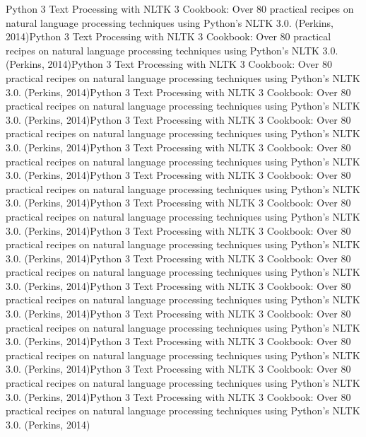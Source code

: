 Python 3 Text Processing with NLTK 3 Cookbook: Over 80 practical recipes on natural language processing techniques using Python's NLTK 3.0. (Perkins, 2014)Python 3 Text Processing with NLTK 3 Cookbook: Over 80 practical recipes on natural language processing techniques using Python's NLTK 3.0. (Perkins, 2014)Python 3 Text Processing with NLTK 3 Cookbook: Over 80 practical recipes on natural language processing techniques using Python's NLTK 3.0. (Perkins, 2014)Python 3 Text Processing with NLTK 3 Cookbook: Over 80 practical recipes on natural language processing techniques using Python's NLTK 3.0. (Perkins, 2014)Python 3 Text Processing with NLTK 3 Cookbook: Over 80 practical recipes on natural language processing techniques using Python's NLTK 3.0. (Perkins, 2014)Python 3 Text Processing with NLTK 3 Cookbook: Over 80 practical recipes on natural language processing techniques using Python's NLTK 3.0. (Perkins, 2014)Python 3 Text Processing with NLTK 3 Cookbook: Over 80 practical recipes on natural language processing techniques using Python's NLTK 3.0. (Perkins, 2014)Python 3 Text Processing with NLTK 3 Cookbook: Over 80 practical recipes on natural language processing techniques using Python's NLTK 3.0. (Perkins, 2014)Python 3 Text Processing with NLTK 3 Cookbook: Over 80 practical recipes on natural language processing techniques using Python's NLTK 3.0. (Perkins, 2014)Python 3 Text Processing with NLTK 3 Cookbook: Over 80 practical recipes on natural language processing techniques using Python's NLTK 3.0. (Perkins, 2014)Python 3 Text Processing with NLTK 3 Cookbook: Over 80 practical recipes on natural language processing techniques using Python's NLTK 3.0. (Perkins, 2014)Python 3 Text Processing with NLTK 3 Cookbook: Over 80 practical recipes on natural language processing techniques using Python's NLTK 3.0. (Perkins, 2014)Python 3 Text Processing with NLTK 3 Cookbook: Over 80 practical recipes on natural language processing techniques using Python's NLTK 3.0. (Perkins, 2014)Python 3 Text Processing with NLTK 3 Cookbook: Over 80 practical recipes on natural language processing techniques using Python's NLTK 3.0. (Perkins, 2014)Python 3 Text Processing with NLTK 3 Cookbook: Over 80 practical recipes on natural language processing techniques using Python's NLTK 3.0. (Perkins, 2014)

